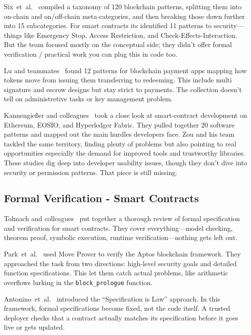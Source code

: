 \documentclass[conference]{IEEEtran}
\begin{document}
Six~et~al.~\cite{six2022blockchain} compiled a taxonomy of 120
blockchain patterns, splitting them into on-chain and on/off-chain
meta-categories, and then breaking those down further into 15
subcategories.  For smart contracts its identified 11 patterns
to security—things like Emergency Stop, Access Restriction, and
Check-Effects-Interaction.  But the team focused mostly on the
conceptual side; they didn't offer formal verification / practical
work you can plug this in code too.

Lu and teammates~\cite{lu2021patterns} found 12 patterns for
blockchain payment apps mapping how tokens move from issuing
them transferring to redeeming.  This include multi signature and
escrow designs but stay strict to payments.  The collection doesn't
tell on administretive tasks or key management problem.

Kannengie{\ss}er and colleagues~\cite{kannengiesser2022challenges} took
a close look at smart-contract development on Ethereum, EOSIO, and
Hyperledger Fabric.  They pulled together 20 software patterns
and mapped out the main hurdles developers face.
Zou and his team~\cite{zou2021smart} tackled the same territory,
finding plenty of problems but also pointing to real
opportunities especially the demand for improved tools and
trustworthy libraries.  These studies dig deep into developer usability
issues, though they don't dive into security or permission patterns.
That piece is still missing.

\subsection{Formal Verification - Smart Contracts}

Tolmach and colleagues~\cite{tolmach2022survey} put together a
thorough review of formal specification and verification for
smart contracts.  They cover everything—model checking, theorem
proof, symbolic execution, runtime verification—nothing gets left
out. 

Park~et~al.~\cite{park2024securing} used Move Prover to
verify the Aptos blockchain framework.  They approached the task from
two directions: high-level security goals and detailed function
specifications.  This let them catch actual problems, like arithmetic
overflows lurking in the \texttt{block\_prologue} function.

Antonino~et~al.~\cite{antonino2022specification} introduced the
``Specification is Law'' approach.  In this framework, formal
specifications become fixed, not the code itself.  A trusted deployer
checks that a contract actually matches its specification before it
goes live or gets updated.
\end{document}
